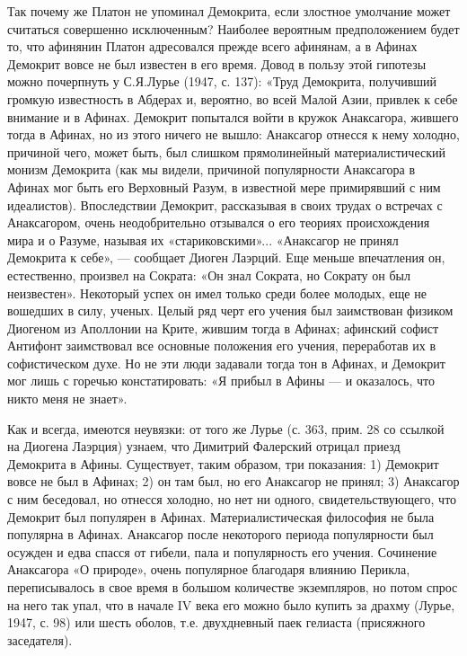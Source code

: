 Так   почему  же   Платон   не  упоминал   Демокрита,  если   злостное
умолчание может  считаться совершенно исключенным?  Наиболее вероятным
предположением будет то, что  афинянин Платон адресовался прежде всего
афинянам, а в Афинах Демокрит вовсе не был известен в его время. Довод
в пользу  этой гипотезы можно  почерпнуть у С.Я.Лурье (1947,  с. 137):
«Труд Демокрита, получивший громкую известность в Абдерах и, вероятно,
во  всей Малой  Азии, привлек  к себе  внимание и  в Афинах.  Демокрит
попытался войти  в кружок  Анаксагора, жившего тогда  в Афинах,  но из
этого  ничего не  вышло: Анаксагор  отнесся к  нему холодно,  причиной
чего, может быть, был  слишком прямолинейный материалистический монизм
Демокрита (как  мы видели,  причиной популярности Анаксагора  в Афинах
мог  быть  его  Верховный  Разум,   в  известной  мере  примирявший  с
ним  идеалистов). Впоследствии  Демокрит, рассказывая  в своих  трудах
о  встречах  с  Анаксагором,  очень  неодобрительно  отзывался  о  его
теориях происхождения  мира и о Разуме,  называя их «стариковскими»...
«Анаксагор не принял  Демокрита к себе», ---  сообщает Диоген Лаэрций.
Еще меньше впечатления он, естественно,  произвел на Сократа: «Он знал
Сократа, но Сократу он был неизвестен». Некоторый успех он имел только
среди более  молодых, еще не вошедших  в силу, ученых. Целый  ряд черт
его учения  был заимствован  физиком Диогеном  из Аполлонии  на Крите,
жившим  тогда  в  Афинах;  афинский софист  Антифонт  заимствовал  все
основные положения его учения, переработав их в софистическом духе. Но
не эти люди задавали тогда тон в Афинах, и Демокрит мог лишь с горечью
констатировать: «Я прибыл  в Афины --- и оказалось, что  никто меня не
знает».

Как и всегда, имеются неувязки: от того  же Лурье (с. 363, прим. 28 со
ссылкой  на Диогена  Лаэрция) узнаем,  что Димитрий  Фалерский отрицал
приезд Демокрита в Афины. Существует, таким образом, три показания: 1)
Демокрит вовсе  не был в  Афинах; 2) он там  был, но его  Анаксагор не
принял; 3)  Анаксагор с ним беседовал,  но отнесся холодно, но  нет ни
одного,  свидетельствующего,  что  Демокрит был  популярен  в  Афинах.
Материалистическая  философия не  была популярна  в Афинах.  Анаксагор
после некоторого  периода популярности  был осужден  и едва  спасся от
гибели,  пала  и  популярность  его учения.  Сочинение  Анаксагора  «О
природе», очень популярное благодаря влиянию Перикла, переписывалось в
свое время  в большом количестве  экземпляров, но потом спрос  на него
так упал, что в начале IV века его можно было купить за драхму (Лурье,
1947,  с.  98)  или  шесть  оболов,  т.е.  двухдневный  паек  гелиаста
(присяжного заседателя).

